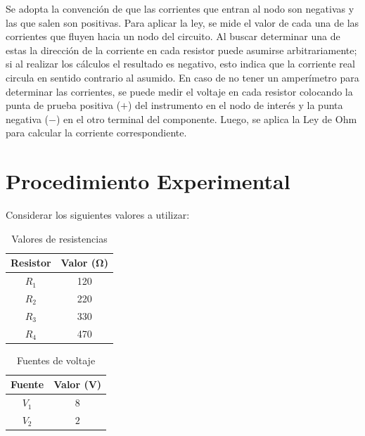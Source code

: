 \documentclass{article}
\begin{document}
    Se adopta la convención de que las corrientes que entran al nodo son negativas y las que salen son positivas. Para aplicar la ley, se mide el valor de cada una de las corrientes que fluyen hacia un nodo del circuito. Al buscar determinar una de estas la dirección de la corriente en cada resistor puede asumirse arbitrariamente; si al realizar los cálculos el resultado es negativo, esto indica que la corriente real circula en sentido contrario al asumido. En caso de no tener un amperímetro para determinar las corrientes, se puede medir el voltaje en cada resistor colocando la punta de prueba positiva ($+$) del instrumento en el nodo de interés y la punta negativa ($-$) en el otro terminal del componente. Luego, se aplica la Ley de Ohm para calcular la corriente correspondiente.
    
    \section{Procedimiento Experimental}

    Considerar los siguientes valores a utilizar:

    \begin{table}[ht]
        \centering
        \begin{tabular}{|c|c|} %
            \midrule 
            Resistor    & Valor (\unit{\ohm})   \\
            \midrule
            $R_1$       & 120                   \\
            $R_2$       & 220                   \\
            $R_3$       & 330                   \\
            $R_4$       & 470                   \\
            \midrule
        \end{tabular}
        \caption{Valores de resistencias}\label{tab:1}
    \end{table}

    \begin{table}[ht]
        \centering
        \begin{tabular}{|c|c|} %
            \midrule 
            Fuente      & Valor (\unit{\volt})  \\
            \midrule
            $V_1$       &  $8$                  \\
            $V_2$       &  $2$                  \\
            \midrule
        \end{tabular}
        \caption{Fuentes de voltaje}\label{tab:2}
    \end{table}
\end{document}
